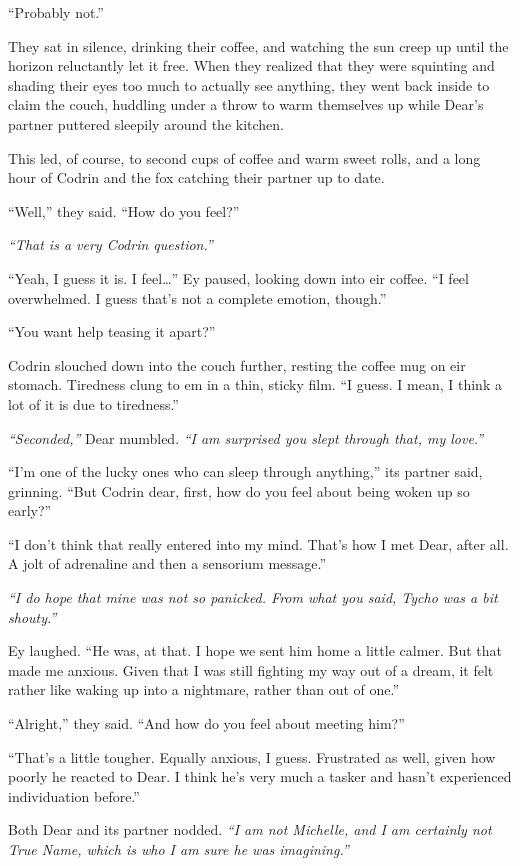 ``Probably not.''

They sat in silence, drinking their coffee, and watching the sun creep up until the horizon reluctantly let it free. When they realized that they were squinting and shading their eyes too much to actually see anything, they went back inside to claim the couch, huddling under a throw to warm themselves up while Dear's partner puttered sleepily around the kitchen.

This led, of course, to second cups of coffee and warm sweet rolls, and a long hour of Codrin and the fox catching their partner up to date.

``Well,'' they said. ``How do you feel?''

\emph{``That is a very Codrin question.''}

``Yeah, I guess it is. I feel\ldots{}'' Ey paused, looking down into eir coffee. ``I feel overwhelmed. I guess that's not a complete emotion, though.''

``You want help teasing it apart?''

Codrin slouched down into the couch further, resting the coffee mug on eir stomach. Tiredness clung to em in a thin, sticky film. ``I guess. I mean, I think a lot of it is due to tiredness.''

\emph{``Seconded,''} Dear mumbled. \emph{``I am surprised you slept through that, my love.''}

``I'm one of the lucky ones who can sleep through anything,'' its partner said, grinning. ``But Codrin dear, first, how do you feel about being woken up so early?''

``I don't think that really entered into my mind. That's how I met Dear, after all. A jolt of adrenaline and then a sensorium message.''

\emph{``I do hope that mine was not so panicked. From what you said, Tycho was a bit shouty.''}

Ey laughed. ``He was, at that. I hope we sent him home a little calmer. But that made me anxious. Given that I was still fighting my way out of a dream, it felt rather like waking up into a nightmare, rather than out of one.''

``Alright,'' they said. ``And how do you feel about meeting him?''

``That's a little tougher. Equally anxious, I guess. Frustrated as well, given how poorly he reacted to Dear. I think he's very much a tasker and hasn't experienced individuation before.''

Both Dear and its partner nodded. \emph{``I am not Michelle, and I am certainly not True Name, which is who I am sure he was imagining.''}

